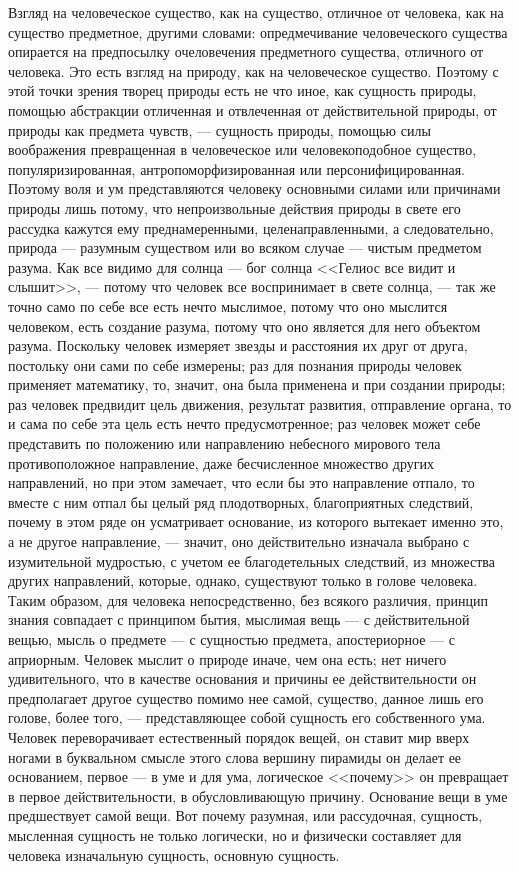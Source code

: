 \documentclass[12pt]{article}
\begin{document}
Взгляд на человеческое существо, как на существо, отличное от человека, как на существо предметное, другими словами: опредмечивание человеческого существа опирается на предпосылку очеловечения предметного существа, отличного от человека. Это есть взгляд на природу, как на человеческое существо. Поэтому с этой точки зрения творец природы есть не что иное, как сущность природы, помощью абстракции отличенная и отвлеченная от действительной природы, от природы как предмета чувств, --- сущность природы, помощью силы воображения превращенная в человеческое или человекоподобное существо, популяризированная, антропоморфизированная или персонифицированная. Поэтому воля и ум представляются человеку основными силами или причинами природы лишь потому, что непроизвольные действия природы в свете его рассудка кажутся ему преднамеренными, целенаправленными, а следовательно, природа --- разумным существом или во всяком случае --- чистым предметом разума. Как все видимо для солнца --- бог солнца <<Гелиос все видит и слышит>>, --- потому что человек все воспринимает в свете солнца, --- так же точно само по себе все есть нечто мыслимое, потому что оно мыслится человеком, есть создание разума, потому что оно является для него объектом разума. Поскольку человек измеряет звезды и расстояния их друг от друга, постольку они сами по себе измерены; раз для познания природы человек применяет математику, то, значит, она была применена и при создании природы; раз человек предвидит цель движения, результат развития, отправление органа, то и сама по себе эта цель есть нечто предусмотренное; раз человек может себе представить по положению или направлению небесного мирового тела противоположное направление, даже бесчисленное множество других направлений, но при этом замечает, что если бы это направление отпало, то вместе с ним отпал бы целый ряд плодотворных, благоприятных следствий, почему в этом ряде он усматривает основание, из которого вытекает именно это, а не другое направление, --- значит, оно действительно изначала выбрано с изумительной мудростью, с учетом ее благодетельных следствий, из множества других направлений, которые, однако, существуют только в голове человека. Таким образом, для человека непосредственно, без всякого различия, принцип знания совпадает с принципом бытия, мыслимая вещь --- с действительной вещью, мысль о предмете --- с сущностью предмета, апостериорное --- с априорным. Человек мыслит о природе иначе, чем она есть; нет ничего удивительного, что в качестве основания и причины ее действительности он предполагает другое существо помимо нее самой, существо, данное лишь его голове, более того, --- представляющее собой сущность его собственного ума. Человек переворачивает естественный порядок вещей, он ставит мир вверх ногами в буквальном смысле этого слова вершину пирамиды он делает ее основанием, первое --- в уме и для ума, логическое <<почему>> он превращает в первое действительности, в обусловливающую причину. Основание вещи в уме предшествует самой вещи. Вот почему разумная, или рассудочная, сущность, мысленная сущность не только логически, но и физически составляет для человека изначальную сущность, основную сущность.
\end{document}
